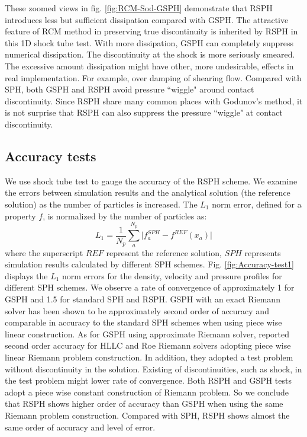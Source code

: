 These zoomed views in fig. \ref{fig:RCM-Sod-GSPH} demonstrate that RSPH introduces less but sufficient dissipation compared with GSPH. The attractive feature of RCM method in preserving true discontinuity is inherited by RSPH in this 1D shock tube test. With more dissipation, GSPH can completely suppress numerical dissipation. The discontinuity at the shock is more seriously smeared. The excessive amount dissipation might have other, more undesirable, effects in real implementation. For example, over damping of shearing flow. Compared with SPH, both GSPH and RSPH avoid pressure ``wiggle" around contact discontinuity. Since RSPH share many common places with Godunov's method, it is not surprise that RSPH can also suppress the pressure ``wiggle" at contact discontinuity.

\subsection{Accuracy tests}
We use shock tube test to gauge the accuracy of the RSPH scheme.
We examine the errors between simulation results and the analytical solution (the reference solution) as the number of particles is increased. The $L_1$ norm error, defined for a property $f$, is normalized by the number of particles as:
\begin{equation}
L_1= \frac{1}{N_p} \sum_a^{N_p} \vert f_a^{SPH} - f^{REF} (x_a) \vert 
\end{equation}
where the superscript $REF$ represent the reference solution, $SPH$ represents simulation results calculated by different SPH schemes. Fig. \ref{fig:Accuracy-test1} displays the $L_1$ norm errors for the density, velocity and pressure profiles for different SPH schemes.
We observe a rate of convergence of approximately 1 for GSPH and 1.5 for standard SPH and RSPH.
GSPH with an exact Riemann solver has been shown to be approximately second order of accuracy \citep{puri2014comparison} and comparable in accuracy to the standard SPH schemes when using piece wise linear construction. As for GSPH using approximate Riemann solver, \citet{puri2014approximate} reported second order accuracy for HLLC and Roe Riemann solvers adopting piece wise linear Riemann problem construction. In addition, they adopted a test problem without discontinuity in the solution. Existing of discontinuities, such as shock, in the test problem might lower rate of convergence. Both RSPH and GSPH tests adopt a piece wise constant construction of Riemann problem. So we conclude that RSPH shows higher order of accuracy than GSPH when using the same Riemann problem construction. Compared with SPH, RSPH shows almost the same order of accuracy and level of error.
